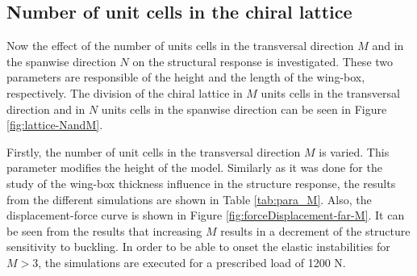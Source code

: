   \clearpage
  \subsection{Number of unit cells in the chiral lattice} \label{subsec:MandN_para}

    Now the effect of the number of units cells in the transversal direction $M$ and in the spanwise direction $N$ on the structural response is investigated. These two parameters are responsible of the height and the length of the wing-box, respectively. The division of the chiral lattice in $M$ units cells in the transversal direction and in $N$ units cells in the spanwise direction can be seen in Figure \ref{fig:lattice-NandM}.

    Firstly, the number of unit cells in the transversal direction $M$ is varied. This parameter modifies the height of the model. Similarly as it was done for the study of the wing-box thickness \boxt influence in the structure response, the results from the different simulations are shown in Table \ref{tab:para_M}. Also, the displacement-force curve is shown in Figure \ref{fig:forceDisplacement-far-M}. It can be seen from the results that increasing $M$ results in a decrement of the structure sensitivity to buckling. In order to be able to onset the elastic instabilities for $M > 3$, the simulations are executed for a prescribed load of 1200 N.

